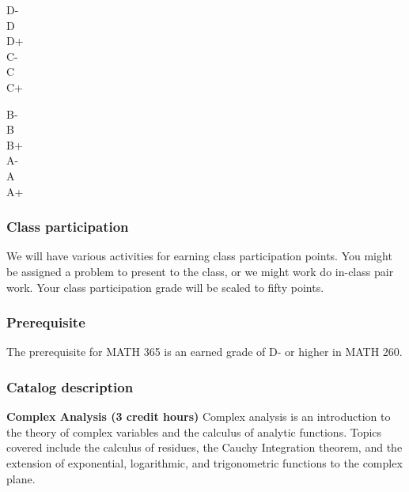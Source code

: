 \documentclass[12pt]{article}
\newcounter{ex}\setcounter{ex}{0}
\newenvironment{mypar}[2]
  {\begin{list}{}%
    {\setlength\leftmargin{#1}
    \setlength\rightmargin{#2}}
    \item[]}
  {\end{list}}
\begin{document}
 \vspace{0.1in}
     \begin{minipage}{5.5in}
  \centering 
\begin{mypar}{0.25in}{0.25in}
    \begin{minipage}{2.5in}
        D-  \dotfill \Dm \\
        D \dotfill \D \\
        D+ \dotfill \Dp \\
        C- \dotfill \Cm  \\
        C \dotfill \C \\
        C+ \dotfill \Cp 
        \end{minipage}
    \phantom{xxx}
    \begin{minipage}{2.5in}
        B- \dotfill \Bm \\
        B \dotfill  \B \\
        B+ \dotfill  \Bp\\
        A- \dotfill  \Am \\
        A \dotfill  \A \\
        A+ \dotfill  \Ap
    \end{minipage}
\end{mypar} 
\end{minipage}

\subsubsection*{Class participation}

We will have various activities for earning class participation points. You 
might be assigned a problem to present to the class, or we might work do 
in-class pair work.  Your class participation grade will be scaled to fifty
points.

\subsubsection*{Prerequisite}

The prerequisite for MATH 365 is an earned grade of D- or higher in 
MATH 260.

\subsubsection*{Catalog description}

\textbf{Complex Analysis (3 credit hours)}
Complex analysis is an introduction to the theory of complex variables and 
the calculus of analytic functions. Topics covered include the calculus of 
residues, the Cauchy Integration theorem, and the extension of 
exponential, logarithmic, and trigonometric functions to the complex plane.
\end{document}
